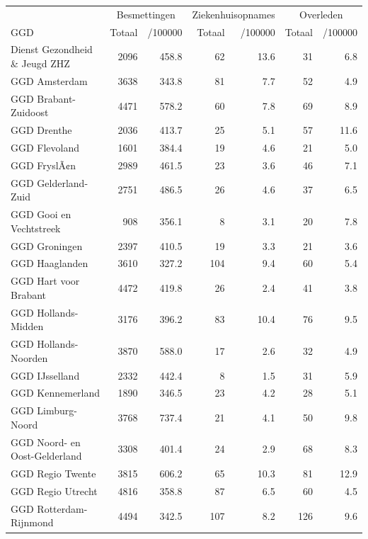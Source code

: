 \documentclass[
  english,
  man,floatsintext]{apa6}
\begin{document}
\begin{table}[H]
\centering\begingroup\fontsize{10}{12}\selectfont

\begin{threeparttable}
\begin{tabular}{lrrrrrr}
\toprule
\multicolumn{1}{c}{ } & \multicolumn{2}{c}{Besmettingen} & \multicolumn{2}{c}{Ziekenhuisopnames} & \multicolumn{2}{c}{Overleden} \\
\cmidrule(l{3pt}r{3pt}){2-3} \cmidrule(l{3pt}r{3pt}){4-5} \cmidrule(l{3pt}r{3pt}){6-7}
GGD & Totaal & /100000 & Totaal & /100000 & Totaal & /100000\\
\midrule
Dienst Gezondheid \& Jeugd ZHZ & 2096 & 458.8 & 62 & 13.6 & 31 & 6.8\\
GGD Amsterdam & 3638 & 343.8 & 81 & 7.7 & 52 & 4.9\\
GGD Brabant-Zuidoost & 4471 & 578.2 & 60 & 7.8 & 69 & 8.9\\
GGD Drenthe & 2036 & 413.7 & 25 & 5.1 & 57 & 11.6\\
GGD Flevoland & 1601 & 384.4 & 19 & 4.6 & 21 & 5.0\\
GGD FryslÃ¢n & 2989 & 461.5 & 23 & 3.6 & 46 & 7.1\\
GGD Gelderland-Zuid & 2751 & 486.5 & 26 & 4.6 & 37 & 6.5\\
GGD Gooi en Vechtstreek & 908 & 356.1 & 8 & 3.1 & 20 & 7.8\\
GGD Groningen & 2397 & 410.5 & 19 & 3.3 & 21 & 3.6\\
GGD Haaglanden & 3610 & 327.2 & 104 & 9.4 & 60 & 5.4\\
GGD Hart voor Brabant & 4472 & 419.8 & 26 & 2.4 & 41 & 3.8\\
GGD Hollands-Midden & 3176 & 396.2 & 83 & 10.4 & 76 & 9.5\\
GGD Hollands-Noorden & 3870 & 588.0 & 17 & 2.6 & 32 & 4.9\\
GGD IJsselland & 2332 & 442.4 & 8 & 1.5 & 31 & 5.9\\
GGD Kennemerland & 1890 & 346.5 & 23 & 4.2 & 28 & 5.1\\
GGD Limburg-Noord & 3768 & 737.4 & 21 & 4.1 & 50 & 9.8\\
GGD Noord- en Oost-Gelderland & 3308 & 401.4 & 24 & 2.9 & 68 & 8.3\\
GGD Regio Twente & 3815 & 606.2 & 65 & 10.3 & 81 & 12.9\\
GGD Regio Utrecht & 4816 & 358.8 & 87 & 6.5 & 60 & 4.5\\
GGD Rotterdam-Rijnmond & 4494 & 342.5 & 107 & 8.2 & 126 & 9.6\\

\end{tabular}
\end{threeparttable}
\end{table}
\end{document}
